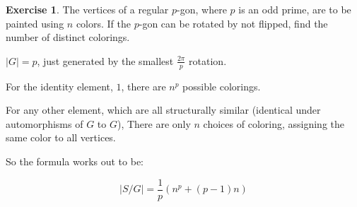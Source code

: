 \documentclass[11pt,oneside]{article}
\numberwithin{equation}{section}
\theoremstyle{definition}
\newtheorem{exercise}{Exercise}
\begin{document}
\begin{exercise}
  The vertices of a regular $p$-gon, where $p$ is an odd prime, are to
  be painted using $n$ colors.  If the $p$-gon can be rotated by not
  flipped, find the number of distinct colorings.
\end{exercise}
\begin{solution}
  $|G| = p$, just generated by the smallest $\frac{2 \pi }{p}$ rotation.

  For the identity element, $1$, there are $n^p$ possible colorings.

  For any other element, which are all structurally similar (identical under automorphisms of $G$ to $G$),
  There are only $n$ choices of coloring, assigning the same color to all vertices.

  So the formula works out to be:

  \[ | S / G | = \frac{1}{p} ( n^p + (p - 1) n)
  \]

  
\end{solution}

\begin{comment}
  \begin{exercise}
    problem
  \end{exercise}
  \begin{solution}
    \Begin{enumerate}[(a)]
    \item
      first answer
    \end{enumerate}
  \end{solution}
\end{comment}
\end{document}
